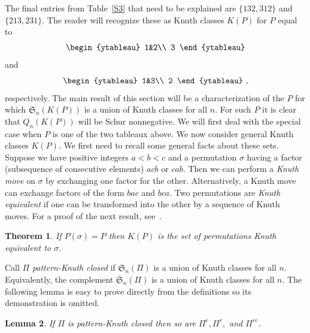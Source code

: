 \documentclass[10pt]{amsart}
\newtheorem{theo}{Theorem}[section]
\newtheorem{lemma}[theo]{Lemma}
\newcommand{\ofS}{\ol{\fS}}
\newcommand{\ol}{\overline}
\newcommand{\si}{\sigma}
\newcommand{\fS}{{\mathfrak S}}
\begin{document}
The final entries from Table~\ref{S3} that need to be explained are $\{132, 312\}$ and $\{213,231\}$. The reader will recognize these as Knuth classes $K(P)$ for $P$ equal to
\begin{equation}
\label{12:3}
\begin{ytableau} 1&2\\ 3 \end{ytableau}
\end{equation}
and
\begin{equation}
\label{13:2}
\begin{ytableau} 1&3\\ 2 \end{ytableau}\ ,
\end{equation}
respectively. The main result of this section will be a characterization of the $P$ for which $\fS_n(K(P))$ is a union of Knuth classes for all $n$. For such $P$ it is clear that $Q_n(K(P))$ will be Schur nonnegative. We will first deal with the special case when $P$ is one of the two tableaux above.
\setcounter{theo}{1}
We now consider general Knuth classes $K(P)$. We first need to recall some general facts about these sets. Suppose we have positive integers $a<b<c$ and a permutation $\si$ having a factor (subsequence of consecutive elements) $acb$ or $cab$. Then we can perform a \emph{Knuth move} on $\si$ by exchanging one factor for the other. Alternatively, a Knuth move can exchange factors of the form $bac$ and $bca$. Two permutations are \emph{Knuth equivalent} if one can be transformed into the other by a sequence of Knuth moves. For a proof of the next result, see~\cite{sag:sym}.
\begin{theo}
\label{Kequiv}
If $P(\si)=P$ then $K(P)$ is the set of permutations Knuth equivalent to $\si$. %
\end{theo}

Call $\Pi$ \emph{pattern-Knuth closed} if $\fS_n(\Pi)$ is a union of Knuth classes for all $n$. Equivalently, the complement $\ofS_n(\Pi)$ is a union of Knuth classes for all $n$. The following lemma is easy to prove directly from the definitions so its demonstration is omitted.
\begin{lemma}
\label{pkc:rc}
If $\Pi$ is pattern-Knuth closed then so are $\Pi^c, \Pi^r,$ and $\Pi^{rc}$. %
\end{lemma}
\end{document}
